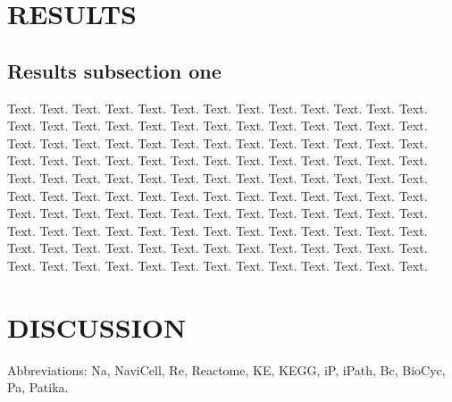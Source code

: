 \documentclass[a4,center,fleqn]{NAR}
\begin{document}
\section{RESULTS}

\subsection{Results subsection one}

Text. Text. Text. Text. Text. Text. Text. Text. Text. Text. Text.
Text. Text. Text. Text. Text. Text. Text. Text. Text. Text. Text.
Text. Text. Text. Text. Text. Text. Text. Text. Text. Text. Text.
Text. Text. Text. Text. Text. Text. Text. Text. Text. Text. Text.
Text. Text. Text. Text. Text. Text. Text. Text. Text. Text. Text.
Text. Text. Text. Text. Text. Text. Text. Text. Text. Text. Text.
Text. Text. Text. Text. Text. Text. Text. Text. Text. Text. Text.
Text. Text. Text. Text. Text. Text. Text. Text. Text. Text. Text.
Text. Text. Text. Text. Text. Text. Text. Text. Text. Text. Text.
Text. Text. Text. Text. Text. Text. Text. Text. Text. Text. Text.
Text. Text. Text. Text. Text. Text. Text. Text. Text. Text. Text.
Text. Text. Text. Text. Text. Text. Text. Text. Text.

\section{DISCUSSION}

\begin{table}
{Abbreviations: Na, NaviCell, Re, Reactome, KE, KEGG, iP, iPath, Bc, BioCyc, Pa, Patika.
}
\end{table}
\end{document}
